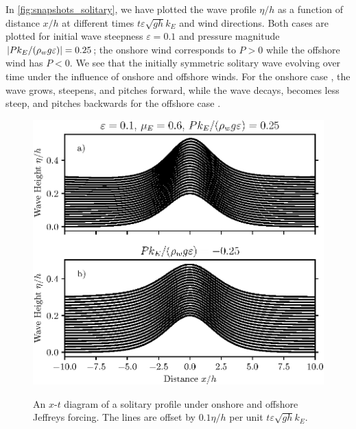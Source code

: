 \documentclass{jfm}
\renewcommand*{\epsilon}{\varepsilon}
\begin{document}
In \cref{fig:snapshots_solitary}, we have plotted the wave profile
$\eta/h$ as a function of distance $x/h$ at different times $t \epsilon
\sqrt{g h} k_E$ and wind directions.
Both cases are plotted for initial wave steepness $\epsilon = 0.1$ and
pressure magnitude $\abs{P k_E/(\rho_w g \epsilon)} = 0.25$; the onshore
wind  corresponds to $P>0$ while the
offshore wind  has $P<0$.
We see that the initially symmetric solitary wave evolving over time
under the influence of  onshore and
 offshore winds.
For the onshore case , the wave grows,
steepens, and pitches forward, while the wave decays, becomes less
steep, and pitches backwards for the offshore case
.

\begin{figure}
  \centering
  { %
    \label{fig:xt_offset_solitary:a}
    \label{fig:xt_offset_solitary:b}
  }
  \includegraphics{XT-Offset.eps}
  \caption{
    An $x$-$t$ diagram of a solitary profile under
    onshore and
    offshore Jeffreys forcing.
    The lines are offset by $0.1 \eta/h$ per unit $t \epsilon \sqrt{g h}
    k_E$.
  }
  \label{fig:xt_offset_solitary}
\end{figure}
\end{document}
